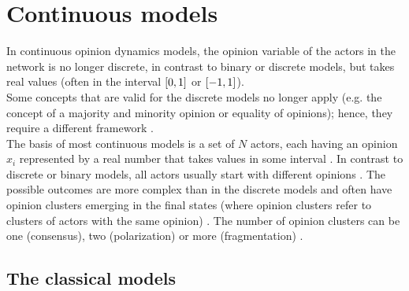 \documentclass[11 pt , letterpaper , twoside , openright]{book}
\begin{document}
\section{Continuous models}\label{Con}

In continuous opinion dynamics models, the opinion variable of the actors in the network is no longer discrete, in contrast to binary or discrete models, but takes real values (often in the interval $\interval{0}{1}$ or $\interval{-1}{1}$).\\
\newline
Some concepts that are valid for the discrete models no longer apply (e.g. the concept of a majority and minority opinion or equality of opinions); hence, they require a different framework \cite{Castellano2009}. \\
\newline
The basis of most continuous models is a set of $N$ actors, each having an opinion $x_i$ represented by a real number that takes values in some interval \cite{Castellano2009}. In contrast to discrete or binary models, all actors usually start with different opinions \cite{Castellano2009}. The possible outcomes are more complex than in the discrete models and often have opinion clusters emerging in the final states (where opinion clusters refer to clusters of actors with the same opinion) \cite{Castellano2009}. The number of opinion clusters can be one (consensus), two (polarization) or more (fragmentation) \cite{Castellano2009}.

\subsection{The classical models}\label{classMod}
\end{document}
